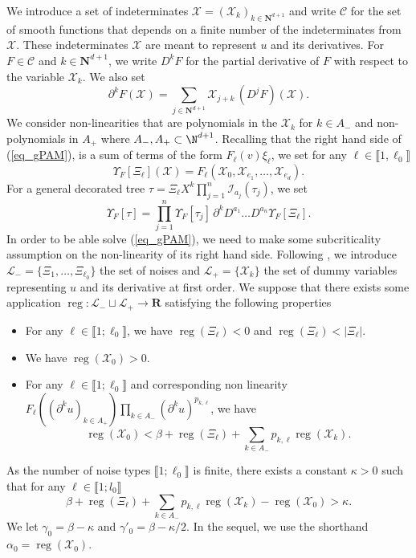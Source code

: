 \documentclass[11pt]{preprint}
\def\reg{\mathord{\mathrm{reg}}}
\def\reg{\mathop{\mathrm{reg}}}
\newcommand{\mcC}{\mathcal{C}}
\newcommand{\mcL}{\mathcal{L}}
\newcommand{\mcI}{\mathcal{I}}
\newcommand{\mcX}{\mathcal{X}}
\def\eqref#1{(\ref{#1})}
\newcommand{\bfN}{\mathbf{N}}
\newcommand{\bfR}{\mathbf{R}}
\newcommand{\bbrack}[1]{ \llbracket #1 \rrbracket }
\begin{document}
	
	We introduce a set of indeterminates $\mcX=(\mcX_{k})_{k\in\bfN^{d+1}}$ and write $\mcC$ for the set of smooth functions  that depends on a finite number of the indeterminates from $\mcX$. These indeterminates $\mcX$ are meant to represent $u$ and its derivatives.
	For $F\in\mcC$ and $k\in \bfN^{d+1}$, we write $D^kF$ for the partial derivative of $F$ with respect to the variable $\mcX_k$. We also set
	$$
	\partial^k F (\mcX) = \sum_{j\in\bfN^{d+1}}  \mcX_{j+k} \,  (D^{j} F)(\mcX).
	$$
	We consider non-linearities that are polynomials in the $\mcX_k$ for $ k \in A_{-} $ and non-polynomials in $ A_+ $ where $A_-, A_+ \subset \N^{d+1}$. Recalling that the right hand side of \eqref{eq_gPAM}, is a sum of terms of the form $F_\ell(v)\xi_\ell$, we set for any $\ell\in\bbrack{1,\ell_0 } $
	$$
	\Upsilon_F[\Xi_\ell]( \mcX ) = F_\ell(\mcX_0,\mcX_{e_1},\dots,\mcX_{e_d}).
	$$
	For a general decorated tree $\tau = \Xi_\ell X^k \prod_{j=1}^n \mcI_{a_j}(\tau_j)$, we set
	\begin{equation}\label{eq_defUpsilon}
	\Upsilon_F[\tau] = \prod_{j=1}^n \Upsilon_F[\tau_j] \,  \partial^k D^{a_1}\dots D^{a_n} \Upsilon_F[\Xi_\ell].
\end{equation}
In order to be able solve \eqref{eq_gPAM}, we need to make some subcriticality assumption on the non-linearity of its right hand side. Following \cite{BCCH}, we introduce $\mcL_-=\{\Xi_1,\dots,\Xi_{\ell_0} \}$ the set of noises and $\mcL_+ = \{  \mcX_k \}$ the set of dummy variables representing $u$ and its derivative at first order. We suppose that there exists some application $\reg : \mcL_- \sqcup \mcL_+ \to \bfR$ satisfying the following properties

\begin{itemize}
\item For any $\ell\in\bbrack{1;\ell_0}$, we have $\reg(\Xi_\ell)< 0$ and $\reg(\Xi_\ell)<|\Xi_\ell|$.
\item We have $\reg(\mcX_0)>0$.
\item For any $\ell\in\bbrack{1;\ell_0}$ and corresponding non linearity $F_\ell( (\partial^k u)_{k \in A_+} )\prod_{k\in A_-} (\partial^{k}u)^{p_{k,\ell}}$, we have
\begin{equation} \label{eq_subcriticality}
	\reg(\mcX_0)< \beta  + \reg(\Xi_\ell) + \sum_{k\in A_-} p_{k,\ell} \reg(\mcX_k).
\end{equation}	

\end{itemize}
As the number of noise types $\bbrack{1;\ell_0}$ is finite, there exists a constant $\kappa>0$ such that for any $\ell \in\bbrack{1;l_0}$
\begin{equation}  \label{eq_subcriticality_kappa}
	 \beta  + \reg(\Xi_\ell) + \sum_{k\in A_-} p_{k, \ell} \reg(\mcX_k) -	\reg(\mcX_0) > \kappa.
\end{equation}
We let $\gamma_0 = \beta-\kappa $ and $\gamma'_0 = \beta-\kappa/2$. In the sequel, we use the shorthand $\alpha_0 = \reg(\mcX_0)$.
\end{document}

